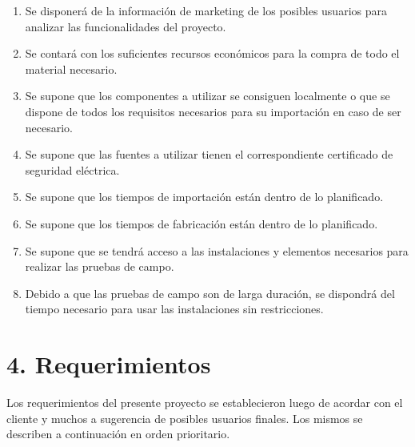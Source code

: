 \documentclass[11pt]{charter}
\begin{document}
\begin{enumerate}
\item Se disponerá de la información de marketing de los posibles usuarios para analizar las funcionalidades del proyecto.
\item Se contará con los suficientes recursos económicos para la compra de todo el material necesario.
\item Se supone que los componentes a utilizar se consiguen localmente o que se dispone de todos los requisitos necesarios para su importación en caso de ser necesario.
\item Se supone que las fuentes a utilizar tienen el correspondiente certificado de seguridad eléctrica.
\item Se supone que los tiempos de importación están dentro de lo planificado.
\item Se supone que los tiempos de fabricación están dentro de lo planificado.
\item Se supone que se tendrá acceso a las instalaciones y elementos necesarios para realizar las pruebas de campo.
\item Debido a que las pruebas de campo son de larga duración, se dispondrá del tiempo necesario para usar las instalaciones sin restricciones.

\end{enumerate}


\section{4. Requerimientos}
\label{sec:requerimientos}

Los requerimientos del presente proyecto se establecieron luego de acordar con el cliente y muchos a sugerencia de posibles usuarios finales. Los mismos se describen a continuación en orden prioritario.
\end{document}
